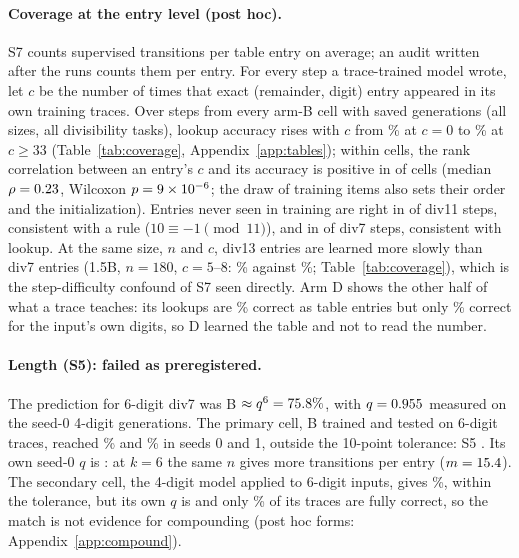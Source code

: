 \documentclass{article}
\theoremstyle{definition}
\begin{document}
\paragraph{Coverage at the entry level (post hoc).} S7 counts supervised transitions per table entry on average; an audit written after the runs counts them per entry. For every step a trace-trained model wrote, let $c$ be the number of times that exact (remainder, digit) entry appeared in its own training traces. Over \covSteps{} steps from every arm-B cell with saved generations (all sizes, all divisibility tasks), lookup accuracy rises with $c$ from \covNTzero\% at $c=0$ to \covNTthirtythree\% at $c\ge33$ (Table~\ref{tab:coverage}, Appendix~\ref{app:tables}); within cells, the rank correlation between an entry's $c$ and its accuracy is positive in \covRhoPos{} of \covRhoCells{} cells (median $\rho=0.23$, Wilcoxon $p=9\times10^{-6}$; the draw of training items also sets their order and the initialization). Entries never seen in training are right in \covCzeroElevenK{} of \covCzeroElevenN{} div11 steps, consistent with a rule ($10\equiv-1\pmod{11}$), and in \covCzeroSevenK{} of \covCzeroSevenN{} div7 steps, consistent with lookup. At the same size, $n$ and $c$, div13 entries are learned more slowly than div7 entries (1.5B, $n=180$, $c=5$--8: \covDthirteenfiveeight\% against \covDsevenfiveeight\%; Table~\ref{tab:coverage}), which is the step-difficulty confound of S7 seen directly. Arm D shows the other half of what a trace teaches: its lookups are \covDlookup\% correct as table entries but only \covDlocal\% correct for the input's own digits, so D learned the table and not to read the number.


\paragraph{Length (S5): failed as preregistered.} The prediction for 6-digit div7 was B $\approx q^6=75.8\%$, with $q=0.955$ measured on the seed-0 4-digit generations. The primary cell, B trained and tested on 6-digit traces, reached \divsevenSixBsZero\% and \divsevenSixBsOne\% in seeds 0 and 1, outside the 10-point tolerance: S5 \verdictSFive. Its own seed-0 $q$ is \pDivsevenSixsZero: at $k=6$ the same $n$ gives more transitions per entry ($m=15.4$). The secondary cell, the 4-digit model applied to 6-digit inputs, gives \divsevenTransferSixB\%, within the tolerance, but its own $q$ is \pDivsevenTransfer{} and only \divsevenTransferTraceOK\% of its traces are fully correct, so the match is not evidence for compounding (post hoc forms: Appendix~\ref{app:compound}).
\end{document}
